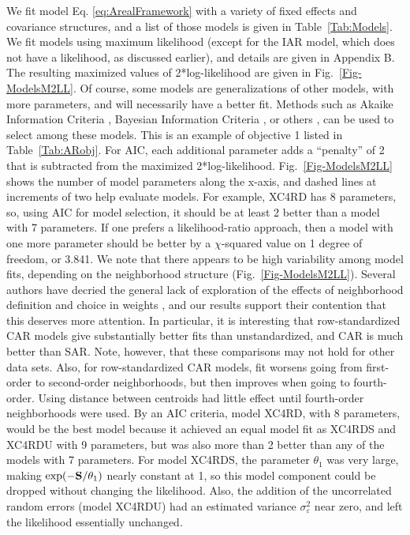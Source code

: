 \documentclass[11pt, titlepage]{article}\usepackage[]{graphicx}\usepackage[]{color}
\begin{document}
\begin{spacing}{1.9}
\begin{flushleft}
We fit model Eq. \ref{eq:ArealFramework} with a variety of fixed effects and covariance structures, and a list of those models is given in Table~\ref{Tab:Models}.  We fit models using maximum likelihood (except for the IAR model, which does not have a likelihood, as discussed earlier), and details are given in Appendix B. The resulting maximized values of 2*log-likelihood are given in Fig.~\ref{Fig-ModelsM2LL}. Of course, some models are generalizations of other models, with more parameters, and will necessarily have a better fit.  Methods such as Akaike Information Criteria \citep[AIC,][]{Akai:Info:1973}, Bayesian Information Criteria \citep[BIC,][]{Schw:esti:1978}, or others \citep[see, e.g.,][]{Burn:Ande:mode:2002,Hoot:Hobb:guid:2015}, can be used to select among these models. This is an example of objective 1 listed in Table~\ref{Tab:ARobj}. For AIC, each additional parameter adds a ``penalty'' of 2 that is subtracted from the maximized 2*log-likelihood.  Fig.~\ref{Fig-ModelsM2LL} shows the number of model parameters along the x-axis, and dashed lines at increments of two help evaluate models. For example, XC4RD has 8 parameters, so, using AIC for model selection, it should be at least 2 better than a model with 7 parameters.  If one prefers a likelihood-ratio approach, then a model with one more parameter should be better by a $\chi$-squared value on 1 degree of freedom, or 3.841. We note that there appears to be high variability among model fits, depending on the neighborhood structure (Fig.~\ref{Fig-ModelsM2LL}).  Several authors have decried the general lack of exploration of the effects of neighborhood definition and choice in weights \citep{Best:Cock:Benn:Wake:Elli:ecol:2001,Earn:Morg:Meng:Ryan:Summ:Bear:eval:2007}, and our results support their contention that this deserves more attention.  In particular, it is interesting that row-standardized CAR models give substantially better fits than unstandardized, and CAR is much better than SAR.  Note, however, that these comparisons may not hold for other data sets. Also, for row-standardized CAR models, fit worsens going from first-order to second-order neighborhoods, but then improves when going to fourth-order.  Using distance between centroids had little effect until fourth-order neighborhoods were used.  By an AIC criteria, model XC4RD, with 8 parameters, would be the best model because it achieved an equal model fit as XC4RDS and XC4RDU with 9 parameters, but was also more than 2 better than any of the models with 7 parameters. For model XC4RDS, the parameter $\theta_1$ was very large, making $\exp(-\mathbf{S}/\theta_1)$ nearly constant at 1, so this model component could be dropped without changing the likelihood.  Also, the addition of the uncorrelated random errors (model XC4RDU) had an estimated variance $\sigma_\varepsilon^2$ near zero, and left the likelihood essentially unchanged. 


\end{flushleft}
\end{spacing}
\end{document}
